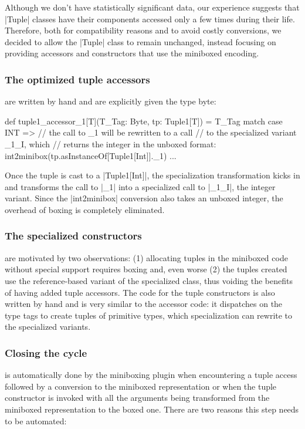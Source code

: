 Although we don't have statistically significant data, our experience suggests that |Tuple| classes have their components accessed only a few times during their life. Therefore, both for compatibility reasons and to avoid costly conversions, we decided to allow the |Tuple| class to remain unchanged, instead focusing on providing accessors and constructors that use the miniboxed encoding.

\subsubsection{The optimized tuple accessors} are written by hand and are explicitly given the type byte:

\begin{lstlisting-nobreak}
 def tuple1_accessor_1[T](T_Tag: Byte, tp: Tuple1[T]) =
   T_Tag match {
     case INT =>
       // the call to _1 will be rewritten to a call
       // to the specialized variant _1_I, which
       // returns the integer in the unboxed format:
       int2minibox(tp.asInstanceOf[Tuple1[Int]]._1)
     ...
   }
\end{lstlisting-nobreak}

Once the tuple is cast to a |Tuple1[Int]|, the specialization transformation kicks in and transforms the call to |_1| into a specialized call to |_1_I|, the integer variant. Since the |int2minibox| conversion also takes an unboxed integer, the overhead of boxing is completely eliminated.

\subsubsection{The specialized constructors} are motivated by two observations: (1) allocating tuples in the miniboxed code without special support requires boxing and, even worse (2) the tuples created use the reference-based variant of the specialized class, thus voiding the benefits of having added tuple accessors. The code for the tuple constructors is also written by hand and is very similar to the accessor code: it dispatches on the type tags to create tuples of primitive types, which specialization can rewrite to the specialized variants.

\subsubsection{Closing the cycle} is automatically done by the miniboxing plugin when encountering a tuple access followed by a conversion to the miniboxed representation or when the tuple constructor is invoked with all the arguments being transformed from the miniboxed representation to the boxed one. There are two reasons this step needs to be automated:

